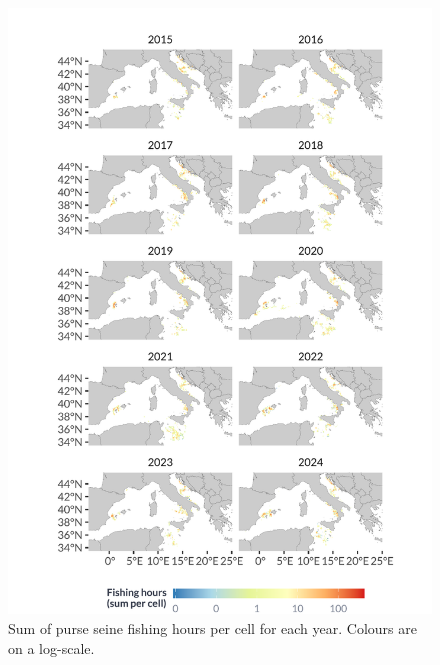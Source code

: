\begin{figure}[H]
	\centering
	\includegraphics[width=1\linewidth, trim=0 0 0 0,clip]{Figures/plots/pss_yearly.pdf}
	\caption{Sum of purse seine fishing hours per cell for each year. Colours are on a log-scale.}
	\label{fig:pss_yearly}
\end{figure}
